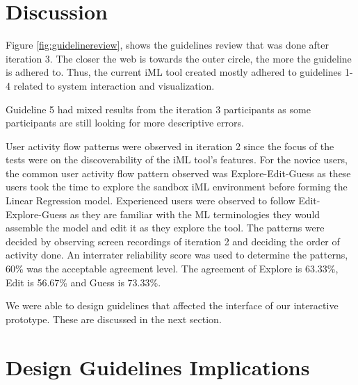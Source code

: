 \documentclass{sigchi}
\begin{document}
\section{Discussion}

Figure \ref{fig:guidelinereview}, shows the guidelines review that was done after iteration 3. The closer the web is towards the outer circle, the more the guideline is adhered to. Thus, the current iML tool created mostly adhered to guidelines 1-4 related to system interaction and visualization. 

Guideline 5 had mixed results from the iteration 3 participants as some participants are still looking for more descriptive errors. 

User activity flow patterns were observed in iteration 2 since the focus of the tests were on the discoverability of the iML tool's features. For the novice users, the common user activity flow pattern observed was Explore-Edit-Guess as these users took the time to explore the sandbox iML environment before forming the Linear Regression model. Experienced users were observed to follow Edit-Explore-Guess as they are familiar with the ML terminologies they would assemble the model and edit it as they explore the tool. The patterns were decided by observing screen recordings of iteration 2 and deciding the order of activity done. An interrater reliability score was used to determine the patterns, 60\% was the acceptable agreement level. The agreement of Explore is 63.33\%, Edit is 56.67\% and Guess is 73.33\%.

We were able to design guidelines that affected the interface of our interactive prototype. These are discussed in the next section. 

\section{Design Guidelines Implications}
\end{document}
